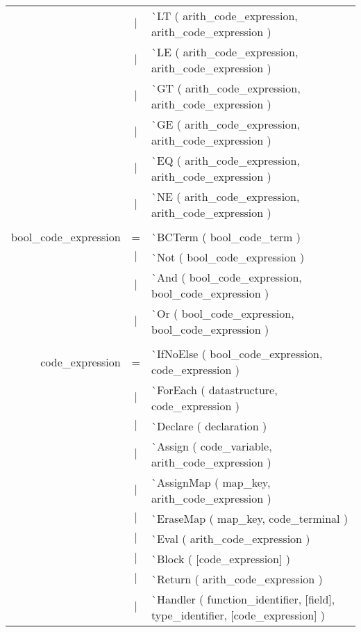 \documentclass{article}
\begin{document}
\begin{tabular}[ht] {rcl}
&$\lvert$ & \`{}LT ( arith\_code\_expression, arith\_code\_expression )\\
&$\lvert$ & \`{}LE ( arith\_code\_expression, arith\_code\_expression )\\
&$\lvert$ & \`{}GT ( arith\_code\_expression, arith\_code\_expression )\\
&$\lvert$ & \`{}GE ( arith\_code\_expression, arith\_code\_expression )\\
&$\lvert$ & \`{}EQ ( arith\_code\_expression, arith\_code\_expression )\\
&$\lvert$ & \`{}NE ( arith\_code\_expression, arith\_code\_expression )\\
\\
bool\_code\_expression &=& \`{}BCTerm ( bool\_code\_term )\\
&$\lvert$ & \`{}Not ( bool\_code\_expression )\\
&$\lvert$ & \`{}And ( bool\_code\_expression, bool\_code\_expression )\\
&$\lvert$ & \`{}Or ( bool\_code\_expression, bool\_code\_expression )\\
\\
code\_expression &=& \`{}IfNoElse ( bool\_code\_expression, code\_expression )\\
&$\lvert$ & \`{}ForEach ( datastructure, code\_expression )\\
&$\lvert$ & \`{}Declare ( declaration )\\
&$\lvert$ & \`{}Assign ( code\_variable, arith\_code\_expression )\\
&$\lvert$ & \`{}AssignMap ( map\_key, arith\_code\_expression )\\
&$\lvert$ & \`{}EraseMap ( map\_key, code\_terminal )\\
&$\lvert$ & \`{}Eval ( arith\_code\_expression )\\
&$\lvert$ & \`{}Block ( [code\_expression] )\\
&$\lvert$ & \`{}Return ( arith\_code\_expression )\\
&$\lvert$ & \`{}Handler ( function\_identifier, [field], type\_identifier, [code\_expression] )\\
\end{tabular}
\pagebreak
\end{document}
